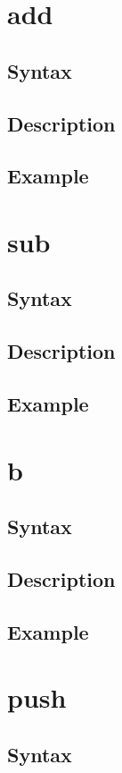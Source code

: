 \documentclass[11pt]{scrartcl}
\begin{document}
\section{add}
\subsection{Syntax}
\subsection{Description}
\subsection{Example}

\section{sub}
\subsection{Syntax}
\subsection{Description}
\subsection{Example}

\section{b}
\subsection{Syntax}
\subsection{Description}
\subsection{Example}

\section{push}
\subsection{Syntax}
\end{document}
